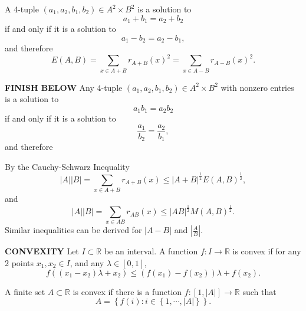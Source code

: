 \documentclass[12pt]{amsart}
\begin{document}
A 4-tuple \((a_1,a_2,b_1,b_2)\in A^{2} \times B^{2}\) is a solution to
\[
    a_1 + b_1 = a_2 + b_2
\]
if and only if it is a solution to
\[
    a_1-b_2 = a_2-b_1
,\]
and therefore
\[
    E(A,B) = \sum _{x \in A + B} r_{A+B} (x)^{2} = \sum _{x \in A - B} r_{A-B} (x)^{2}
.\]


\textbf{FINISH BELOW}
Any 4-tuple \((a_1,a_2,b_1,b_2) \in A^{2} \times B^{2}\) with nonzero entries is a solution to
\[
    a_1b_1 = a_2b_2
\]
if and only if it is a solution to
\[
    \frac{a_1}{b_2} = \frac{a_2}{b_1} 
,\]
and therefore


By the Cauchy-Schwarz Inequality
\[
    \left\lvert A \right\rvert \left\lvert B \right\rvert = \sum _{x \in A + B} r_{A + B} (x) \leq \left\lvert A + B \right\rvert ^{\frac{1}{2} } E(A,B)^{\frac{1}{2} }
,\]
and
\[
    \left\lvert A \right\rvert \left\lvert B \right\rvert = \sum _{x \in AB} r_{AB} (x) \leq \left\lvert AB \right\rvert ^{\frac{1}{2} }M(A,B)^{\frac{1}{2} }
.\]
Similar inequalities can be derived for \(\left\lvert A-B \right\rvert \) and \(\left\lvert \frac{A}{B}  \right\rvert \).



\textbf{CONVEXITY}
Let \(I \subset \mathbb{R} \) be an interval. 
    A function \(f: I \to \mathbb{R} \) is convex if for
    any 2 points \(x_1,x_2 \in I\), and any \(\lambda \in [0,1]\),
    \[
        f((x_1-x_2)\lambda + x_2) \leq \left( f(x_1)-f(x_2) \right) \lambda + f(x_2)
    .\]

    A finite set \(A \subset \mathbb{R}\) is convex if there is a function \(f: [1, \left\lvert A \right\rvert ] \to \mathbb{R} \)
such that
\[
    A = \left\{ f(i) : i \in \left\{ 1, \cdots , \left\lvert A \right\rvert  \right\}  \right\} 
.\]
\end{document}

